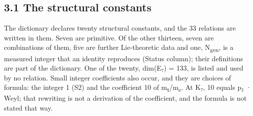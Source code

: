 \documentclass[11pt,a4paper]{article}
\begin{document}
\subsection{3.1 The structural constants}\label{the-structural-constants}

The dictionary declares twenty structural constants, and the 33 relations are written in them. Seven are primitive. Of the other thirteen, seven are combinations of them, five are further Lie-theoretic data and one, N\textsubscript{gen}, is a measured integer that an identity reproduces (Status column); their definitions are part of the dictionary. One of the twenty, dim(E₇) = 133, is listed and used by no relation. Small integer coefficients also occur, and they are choices of formula: the integer 1 (S2) and the coefficient 10 of m\textsubscript{τ}/m\textsubscript{e}. At K₇, 10 equals p₂ · Weyl; that rewriting is not a derivation of the coefficient, and the formula is not stated that way.
\end{document}
